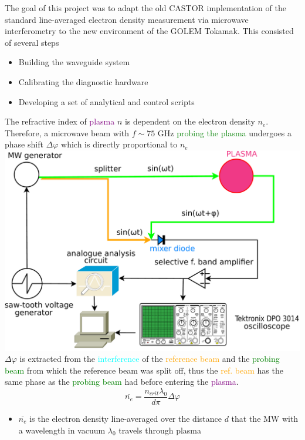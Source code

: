 \documentclass[portrait,final,a0paper]{baposter}
\begin{document}
\begin{poster}
{The goal of this project was to adapt the old CASTOR implementation of the standard line-averaged electron density measurement via microwave interferometry to the new environment of the GOLEM Tokamak. This consisted of several steps
\begin{itemize}
    \item Building the waveguide system
    \item Calibrating the diagnostic hardware 
    \item Developing a set of analytical and control scripts
\end{itemize}
 }

 {
 \begin{multicols}{2} The refractive index of \textcolor{purple}{plasma} $n$ is dependent on the electron density $n_e$. Therefore, a microwave beam with $f \sim 75$ GHz \textcolor{green}{probing the plasma} undergoes a phase shift $\Delta \varphi$ which is directly proportional to $n_e$
\includegraphics[width=.5\textwidth]{schema.pdf}
$\Delta \varphi$ is extracted from the \textcolor{cyan}{interference} of the \textcolor{orange}{reference beam} and the \textcolor{green}{probing beam} from which the reference beam was split off, thus the \textcolor{orange}{ref. beam} has the same phase as the \textcolor{green}{probing beam} had before entering the \textcolor{purple}{plasma}.
\begin{equation}
    \overline{n_e}=\frac{ n_{crit}\lambda_0 }{d \pi}\Delta \varphi
    \label{eq:ne}
\end{equation}
\begin{itemize}
    \item $\overline{n_e}$ is the electron density line-averaged over the distance $d$ that the MW with a wavelength in vacuum $\lambda_0$ travels through plasma



\end{itemize}
\end{multicols}}
\end{poster}
\end{document}
